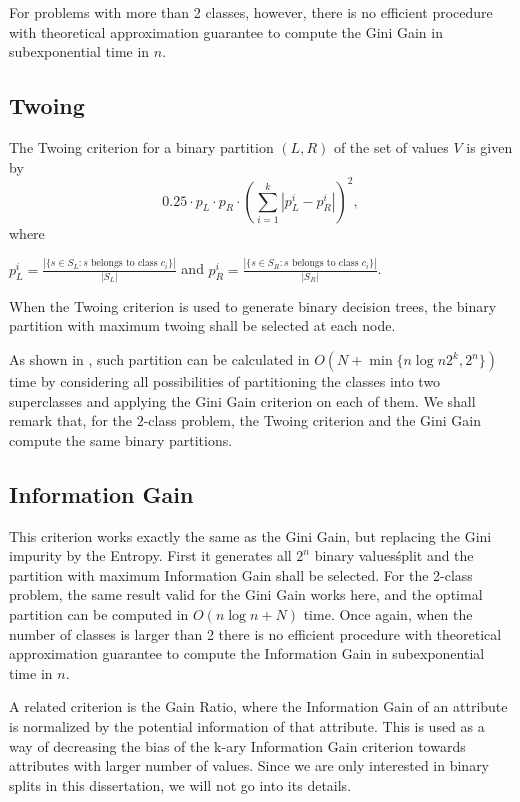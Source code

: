 For problems with more than 2 classes, however, there is no efficient procedure with theoretical approximation guarantee to compute the Gini Gain in subexponential time in $n$.


\subsection{Twoing}
The Twoing criterion
for a  binary partition $(L,R)$ 
of the set of values $V$ is given by
$$ 0.25 \cdot p_L \cdot p_R  \cdot \left ( \sum_{i=1}^k | p_L^i - p_R^i | \right )^2, $$
where

$ p_L^i= \frac{|\{s \in S_L: s \mbox{ belongs to class } c_i \}|}{ |S_L|} $
 and 
$ p_R^i= \frac{|\{s \in S_R: s \mbox{ belongs to class } c_i\} |}{ |S_R|} $.

When the Twoing criterion is used to generate binary decision trees, the binary partition with maximum twoing shall be selected at each node. 

As shown in \cite{Breiman:84}, such partition can be calculated in $O(N + \min \{ n \log n 2^k, 2^n \} )$
time by considering all possibilities of partitioning the classes into two superclasses
and applying the Gini Gain criterion on each of them.
We shall remark that, for the $2$-class problem, the Twoing criterion and the
Gini Gain compute the same binary partitions.

\subsection{Information Gain}
This criterion works exactly the same as the Gini Gain, but replacing the Gini impurity by the Entropy. First it generates all $2^n$ binary values\' split and the partition with maximum Information Gain shall be selected.
For the 2-class problem, the same result valid for the Gini Gain works here, and the optimal partition  
can be computed  in $O(n \log n + N )$ time. Once again, when the number of classes is larger than 2 there is no efficient procedure with theoretical approximation guarantee to compute the Information Gain in subexponential time in $n$.

A related criterion is the Gain Ratio, where the Information Gain of an attribute is normalized by the potential information of that attribute. This is used as a way of decreasing the bias of the k-ary Information Gain criterion towards attributes with larger number of values. Since we are only interested in binary splits in this dissertation, we will not go into its details.


